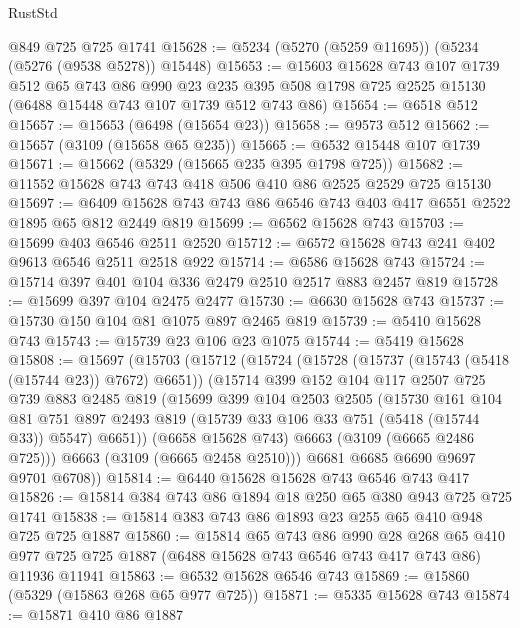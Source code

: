 \begin{lexlean}{RustStd}
\begin{coremodule}
    @849
    @725
    @725
    @1741
@15628 := @5234 (@5270 (@5259 @11695)) (@5234 (@5276 (@9538 @5278)) @15448)
@15653 := @15603
    @15628
    @743
    @107
    @1739
    @512
    @65
    @743
    @86
    @990
    @23
    @235
    @395
    @508
    @1798
    @725
    @2525
    @15130
    (@6488 @15448 @743 @107 @1739 @512 @743 @86)
@15654 := @6518 @512
@15657 := @15653 (@6498 (@15654 @23))
@15658 := @9573 @512
@15662 := @15657 (@3109 (@15658 @65 @235))
@15665 := @6532 @15448 @107 @1739
@15671 := @15662 (@5329 (@15665 @235 @395 @1798 @725))
@15682 := @11552 @15628 @743 @743 @418 @506 @410 @86 @2525 @2529 @725 @15130
@15697 := @6409 @15628 @743 @743 @86 @6546 @743 @403 @417 @6551 @2522 @1895 @65 @812 @2449 @819
@15699 := @6562 @15628 @743
@15703 := @15699 @403 @6546 @2511 @2520
@15712 := @6572 @15628 @743 @241 @402 @9613 @6546 @2511 @2518 @922
@15714 := @6586 @15628 @743
@15724 := @15714 @397 @401 @104 @336 @2479 @2510 @2517 @883 @2457 @819
@15728 := @15699 @397 @104 @2475 @2477
@15730 := @6630 @15628 @743
@15737 := @15730 @150 @104 @81 @1075 @897 @2465 @819
@15739 := @5410 @15628 @743
@15743 := @15739 @23 @106 @23 @1075
@15744 := @5419 @15628
@15808 := @15697
    (@15703
      (@15712
        (@15724
          (@15728 (@15737 (@15743 (@5418 (@15744 @23)) @7672) @6651))
          (@15714
            @399
            @152
            @104
            @117
            @2507
            @725
            @739
            @883
            @2485
            @819
            (@15699
              @399
              @104
              @2503
              @2505
              (@15730
                @161
                @104
                @81
                @751
                @897
                @2493
                @819
                (@15739 @33 @106 @33 @751 (@5418 (@15744 @33)) @5547)
                @6651))
            (@6658 @15628 @743)
            @6663
            (@3109 (@6665 @2486 @725)))
          @6663
          (@3109 (@6665 @2458 @2510)))
        @6681
        @6685
        @6690
        @9697
        @9701
        @6708))
@15814 := @6440 @15628 @15628 @743 @6546 @743 @417
@15826 := @15814 @384 @743 @86 @1894 @18 @250 @65 @380 @943 @725 @725 @1741
@15838 := @15814 @383 @743 @86 @1893 @23 @255 @65 @410 @948 @725 @725 @1887
@15860 := @15814
    @65
    @743
    @86
    @990
    @28
    @268
    @65
    @410
    @977
    @725
    @725
    @1887
    (@6488 @15628 @743 @6546 @743 @417 @743 @86)
    @11936
    @11941
@15863 := @6532 @15628 @6546 @743
@15869 := @15860 (@5329 (@15863 @268 @65 @977 @725))
@15871 := @5335 @15628 @743
@15874 := @15871 @410 @86 @1887

\end{coremodule}
\end{lexlean}
